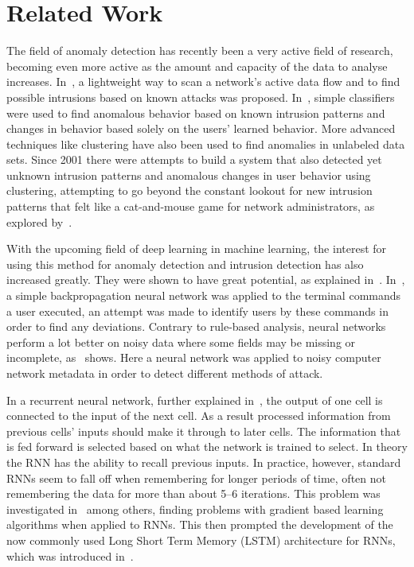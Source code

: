 \chapter{Related Work}\label{ch:related_work}

The field of anomaly detection has recently been a very active field of research, becoming even more active as the amount and capacity of the data to analyse increases. In~\cite{roesch1999snort}, a lightweight way to scan a network's active data flow and to find possible intrusions based on known attacks was proposed. In~\cite{lee1998data}, simple classifiers were used to find anomalous behavior based on known intrusion patterns and changes in behavior based solely on the users' learned behavior. More advanced techniques like clustering have also been used to find anomalies in unlabeled data sets. Since 2001 there were attempts to build a system that also detected yet unknown intrusion patterns and anomalous changes in user behavior using clustering, attempting to go beyond the constant lookout for new intrusion patterns that felt like a cat-and-mouse game for network administrators, as explored by~\cite{Portnoy01intrusiondetection}.

With the upcoming field of deep learning in machine learning, the interest for using this method for anomaly detection and intrusion detection has also increased greatly. They were shown to have great potential, as explained in~\cite{lecun2015deep}. In~\cite{ryan1998intrusion}, a simple backpropagation neural network was applied to the terminal commands a user executed, an attempt was made to identify users by these commands in order to find any deviations. Contrary to rule-based analysis, neural networks perform a lot better on noisy data where some fields may be missing or incomplete, as~\cite{cannady1998artificial} shows. Here a neural network was applied to noisy computer network metadata in order to detect different methods of attack.

In a recurrent neural network, further explained in~\cite{lecun2015deep}, the output of one cell is connected to the input of the next cell. As a result processed information from previous cells' inputs should make it through to later cells. The information that is fed forward is selected based on what the network is trained to select. In theory the RNN has the ability to recall previous inputs. In practice, however, standard RNNs seem to fall off when remembering for longer periods of time, often not remembering the data for more than about 5--6 iterations. This problem was investigated in~\cite{bengio1994learning} among others, finding problems with gradient based learning algorithms when applied to RNNs. This then prompted the development of the now commonly used Long Short Term Memory (LSTM) architecture for RNNs, which was introduced in~\cite{hochreiter1997long}.

